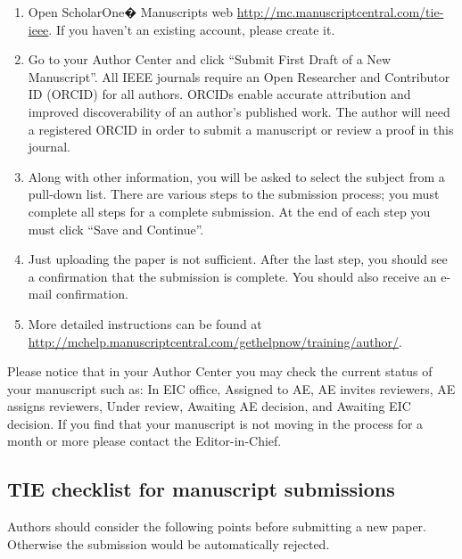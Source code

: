 \documentclass[journal]{IEEEtranTIE}
\begin{document}
\begin{enumerate}[1)]
	\item Open ScholarOne� Manuscripts web \url{http://mc.manuscriptcentral.com/tie-ieee}. If you haven't an existing account, please create it.
	\item Go to your Author Center and click ``Submit First Draft of a New Manuscript''. All IEEE journals require an Open Researcher and Contributor ID (ORCID) for all authors. ORCIDs enable accurate attribution and improved discoverability of an author's published work. The author will need a registered ORCID in order to submit a manuscript or review a proof in this journal.
	\item Along with other information, you will be asked to select the subject from a pull-down list. There are various steps to the submission process; you must complete all steps for a complete submission. At the end of each step you must click ``Save and Continue''.
	\item Just uploading the paper is not sufficient. After the last step, you should see a confirmation that the submission is complete. You should also receive an e-mail confirmation.
	\item More detailed instructions can be found at \url{http://mchelp.manuscriptcentral.com/gethelpnow/training/author/}.
\end{enumerate}

Please notice that in your Author Center you may check the current status of your manuscript such as: In EIC office, Assigned to AE, AE invites reviewers, AE assigns reviewers, Under review, Awaiting AE decision, and Awaiting EIC decision. If you find that your manuscript is not moving in the process for a month or more please contact the Editor-in-Chief.

\subsection{TIE checklist for manuscript submissions}

Authors should consider the following points before submitting a new paper. Otherwise the submission would be automatically rejected.
\end{document}
